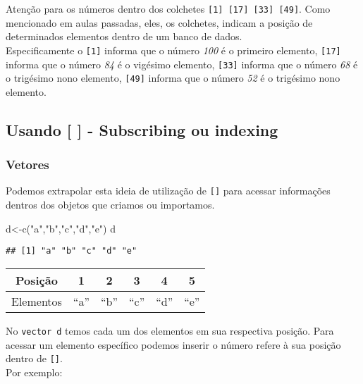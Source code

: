 \documentclass[
]{book}
\newenvironment{Shaded}{\begin{snugshade}}{\end{snugshade}}
\newcommand{\FunctionTok}[1]{\textcolor[rgb]{0.00,0.00,0.00}{#1}}
\newcommand{\NormalTok}[1]{#1}
\newcommand{\OtherTok}[1]{\textcolor[rgb]{0.56,0.35,0.01}{#1}}
\newcommand{\StringTok}[1]{\textcolor[rgb]{0.31,0.60,0.02}{#1}}
\begin{document}
Atenção para os números dentro dos colchetes \texttt{{[}1{]}\ {[}17{]}\ {[}33{]}\ {[}49{]}}. Como mencionado em aulas passadas, eles, os colchetes, indicam a posição de determinados elementos dentro de um banco de dados.\\
Especificamente o \texttt{{[}1{]}} informa que o número \emph{100} é o primeiro elemento, \texttt{{[}17{]}} informa que o número \emph{84} é o vigésimo elemento, \texttt{{[}33{]}} informa que o número \emph{68} é o trigésimo nono elemento, \texttt{{[}49{]}} informa que o número \emph{52} é o trigésimo nono elemento.

\hypertarget{usando---subscribing-ou-indexing}{%
\subsection{Usando {[} {]} - Subscribing ou indexing}\label{usando---subscribing-ou-indexing}}

\hypertarget{vetores}{%
\subsubsection{Vetores}\label{vetores}}

Podemos extrapolar esta ideia de utilização de \texttt{{[}{]}} para acessar informações dentros dos objetos que criamos ou importamos.

\begin{Shaded}
\begin{Highlighting}[]
\NormalTok{d}\OtherTok{\textless{}{-}}\FunctionTok{c}\NormalTok{(}\StringTok{"a"}\NormalTok{,}\StringTok{"b"}\NormalTok{,}\StringTok{"c"}\NormalTok{,}\StringTok{"d"}\NormalTok{,}\StringTok{"e"}\NormalTok{)}
\NormalTok{d}
\end{Highlighting}
\end{Shaded}

\begin{verbatim}
## [1] "a" "b" "c" "d" "e"
\end{verbatim}

\begin{longtable}[]{@{}cccccc@{}}
\toprule
Posição & 1 & 2 & 3 & 4 & 5 \\
\midrule
\endhead
Elementos & ``a'' & ``b'' & ``c'' & ``d'' & ``e'' \\
\bottomrule
\end{longtable}

No \texttt{vector\ d} temos cada um dos elementos em sua respectiva posição. Para acessar um elemento específico podemos inserir o número refere à sua posição dentro de \texttt{{[}{]}}.\\
Por exemplo:
\end{document}
